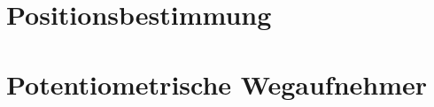 \section{Positionsbestimmung}
\begin{frame}
    \frametitle{\insertsection}

    

\end{frame}


\section{Potentiometrische Wegaufnehmer}
\begin{frame}
    \frametitle{\insertsection}

    

\end{frame}



